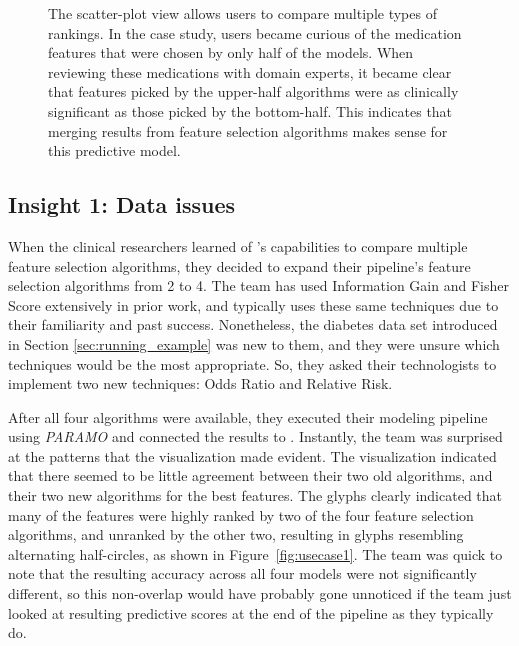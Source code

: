 \begin{figure}[ht]
{\begin{tikzpicture}
\end{tikzpicture}%
}
\caption[The scatter-plot view allows to compare multiple types of rankings.]{
The scatter-plot view allows users to compare multiple types of rankings.  In the case study, users became curious of the medication features that were chosen by only half of the models.  When reviewing these medications with domain experts, it became clear that features picked by the upper-half algorithms were as clinically significant as those picked by the bottom-half.  This indicates that merging results from feature selection algorithms makes sense for this predictive model.
}
\label{fig:usecase2}
\end{figure}

\subsection{Insight 1: Data issues}
When the clinical researchers learned of \infuse's capabilities
to compare multiple feature selection algorithms, they decided to
expand their pipeline's feature selection algorithms from 2 to 4.
The team has used Information Gain and Fisher Score extensively
in prior work, and typically uses these same techniques due
to their familiarity and past success.
Nonetheless, the diabetes data set introduced in Section \ref{sec:running_example} was new to them, and they were unsure which techniques would be the most appropriate. So, they asked their technologists to implement two new techniques: Odds Ratio and Relative Risk.

After all four algorithms were available, they executed their modeling pipeline
using \textit{PARAMO} \cite{paramo} and connected the results to \infuse.
Instantly, the team was surprised at the patterns that the visualization made evident.
The visualization indicated that there seemed to be little agreement between their two
old algorithms, and their two new algorithms for the best features.
The glyphs clearly indicated that many of the features were
highly ranked by two of the four feature selection algorithms,
and unranked by the other two, resulting in glyphs resembling alternating half-circles,
as shown in Figure~\ref{fig:usecase1}.
The team was quick to note that the resulting accuracy across
all four models were not significantly different,
so this non-overlap would have probably gone unnoticed if the
team just looked at resulting predictive scores at the
end of the pipeline as they typically do.


